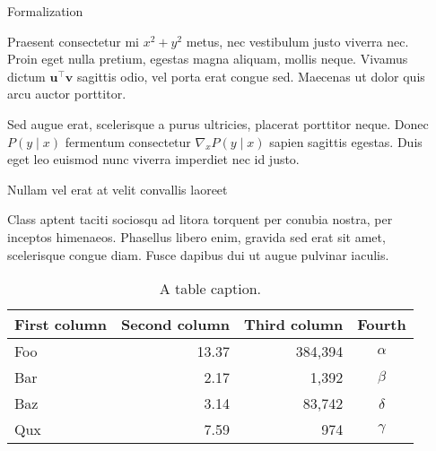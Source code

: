 \documentclass[usenames, dvipsnames, final]{beamer}
\newlength{\sepwidth}
\newlength{\colwidth}
\newcommand{\separatorcolumn}{\begin{column}{\sepwidth}\end{column}}
\begin{document}
\begin{frame}[t]
\begin{columns}[t]
\separatorcolumn

\begin{column}{\colwidth}
   \begin{block}{Formalization}


    Praesent consectetur mi $x^2 + y^2$ metus, nec vestibulum justo viverra
    nec. Proin eget nulla pretium, egestas magna aliquam, mollis neque. Vivamus
    dictum $\mathbf{u}^\intercal\mathbf{v}$ sagittis odio, vel porta erat
    congue sed. Maecenas ut dolor quis arcu auctor porttitor.


    Sed augue erat, scelerisque a purus ultricies, placerat porttitor neque.
    Donec $P(y \mid x)$ fermentum consectetur $\nabla_x P(y \mid x)$ sapien
    sagittis egestas. Duis eget leo euismod nunc viverra imperdiet nec id
    justo.

  \end{block}

  \begin{block}{Nullam vel erat at velit convallis laoreet}

    Class aptent taciti sociosqu ad litora torquent per conubia nostra, per
    inceptos himenaeos. Phasellus libero enim, gravida sed erat sit amet,
    scelerisque congue diam. Fusce dapibus dui ut augue pulvinar iaculis.

    \begin{table}
      \centering
      \begin{tabular}{l r r c}
        \toprule
        \textbf{First column} & \textbf{Second column} & \textbf{Third column} & \textbf{Fourth} \\
        \midrule
        Foo & 13.37 & 384,394 & $\alpha$ \\
        Bar & 2.17 & 1,392 & $\beta$ \\
        Baz & 3.14 & 83,742 & $\delta$ \\
        Qux & 7.59 & 974 & $\gamma$ \\
        \bottomrule
      \end{tabular}
      \caption{A table caption.}
    \end{table}


\end{block}
\end{column}
\end{columns}
\end{frame}
\end{document}
